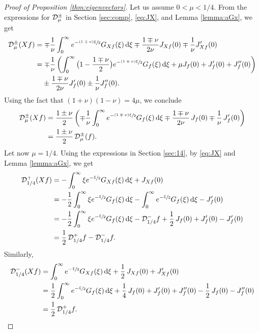 \documentclass[JEP,XML,SOM,NoEqCountersInSection,Unicode,published]{cedram}
\newcommand{\tpsfrac}[3]{\sfrac{(#1)#3}{#2}}
\newcommand*{\diff}{\mathop{}\!\mathrm{d}}
\newcommand{\Dpm}[1]{\mathcal{D}_\mu^{\pm} #1}
\newcommand{\Dpmp}[1]{\mathcal{D}_\mu^{\pm}(#1)}
\theoremstyle{definition}
\begin{document}
\begin{proof}[{Proof of Proposition \ref{thm:eigenvectors}}]
Let us assume $0<\mu< 1/4$. From the expressions for $\Dpm$ in Section \ref{sec:comp}, \eqref{eq:JX}, and Lemma \ref{lemma:aGx}, we get
\begin{equation*}
\begin{split}
\Dpmp{Xf} &= \mp \frac{1}{\nu} \int_0^\infty e^{-\tpsfrac{1 \mp \nu}{2}\xi} G_{Xf}(\xi) \diff \xi \mp \frac{1 \mp \nu}{2\nu} J_{Xf}(0) \mp \frac{1}{\nu} J'_{Xf}(0)\\
&= \mp \frac{1}{\nu} \left(\int_0^\infty \big(1 -\frac{1 \mp \nu}{2}\big) e^{-\tpsfrac{1 \mp \nu}{2}\xi} G_f(\xi) \diff \xi + \mu J_f(0) + J_f'(0) + J_f''(0) \right) \\
&\hphantom{{}=} \pm \frac{1 \mp \nu}{2\nu} J'_f(0) \pm \frac{1}{\nu} J''_f(0).
\end{split}
\end{equation*}
Using the fact that $(1+\nu)(1-\nu) = 4 \mu$, we conclude
\begin{align*}
\Dpmp{Xf} &= \frac{1 \pm \nu}{2} \left(\mp \frac{1}{\nu} \int_0^\infty e^{-\tpsfrac{1 \mp \nu}{2}\xi} G_f(\xi) \diff \xi \mp \frac{1 \mp \nu}{2\nu} \,J_f(0) \mp \frac{1}{\nu}\, J_f'(0) \right)\\
& = \frac{1 \pm \nu}{2}\, \Dpmp{f}.
\end{align*}
Let now $\mu = 1/4$. Using the expressions in Section \ref{sec:14}, by \eqref{eq:JX} and Lemma \ref{lemma:aGx}, we get
\begin{align*}
\mathcal{D}_{1/4}^{+}(Xf) &= - \int_0^\infty \xi e^{-\sfrac{\xi}{2}} G_{Xf}(\xi) \diff \xi + J_{Xf}(0)\\
&=- \frac{1}{2} \int_0^\infty \xi e^{-\sfrac{\xi}{2}} G_{f}(\xi) \diff \xi -\int_0^\infty e^{-\sfrac{\xi}{2}} G_{f}(\xi) \diff \xi -J_f'(0) \\
&=- \frac{1}{2} \int_0^\infty \xi e^{-\sfrac{\xi}{2}} G_{f}(\xi) \diff \xi -\mathcal{D}_{1/4}^{-}f +\frac{1}{2}\,J_f(0) + J_f'(0) -J_f'(0)\\
& = \frac{1}{2}\, \mathcal{D}_{1/4}^{+}f - \mathcal{D}_{1/4}^{-}f .
\end{align*}
Similarly,
\begin{align*}
\mathcal{D}_{1/4}^{-}(Xf) &= \int_0^\infty e^{-\sfrac{\xi}{2}} G_{Xf}(\xi) \diff \xi + \frac{1}{2}\, J_{Xf}(0) + J_{Xf}'(0)\\
&=\frac{1}{2}\int_0^\infty e^{-\sfrac{\xi}{2}} G_{f}(\xi) \diff \xi + \frac{1}{4}\, J_f(0) + J'_f(0) + J_f''(0) - \frac{1}{2}\,J_{f}(0) - J_{f}''(0)\\
& = \frac{1}{2}\, \mathcal{D}_{1/4}^{+}f.
\end{align*}


\end{proof}
\end{document}
